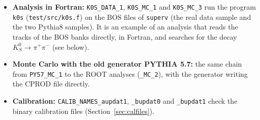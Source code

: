 \begin{itemize}
The two groups show how to run the simulation at a different energy and the dependence of the results on it.
\item \textbf{Analysis in Fortran:} \texttt{K0S\_\allowbreak{}DATA\_\allowbreak{}1}, \texttt{K0S\_\allowbreak{}MC\_\allowbreak{}1} and \texttt{K0S\_\allowbreak{}MC\_\allowbreak{}3} run the program \texttt{k0s} (\texttt{test/\allowbreak{}src/\allowbreak{}k0s.f}) on the BOS files of \texttt{superv}
(the real data sample and the two Pythia8 samples). It is an example of an analysis that reads the tracks of the BOS banks directly, in Fortran, and searches for the decay $K^0_S\to\pi^+\pi^-$ (see below).
\item \textbf{Monte Carlo with the old generator PYTHIA 5.7:} the same chain from \texttt{PY57\_MC\_1} to the ROOT analyses (\texttt{\_MC\_2}), with
the generator writing the CPROD file directly.
\item \textbf{Calibration:} \texttt{CALIB\_\allowbreak{}NAMES\_\allowbreak{}aupdat1}, \texttt{\_bupdat0} and \texttt{\_bupdat1} check the binary calibration files
(Section~\ref{sec:calfiles}).
\end{itemize}
